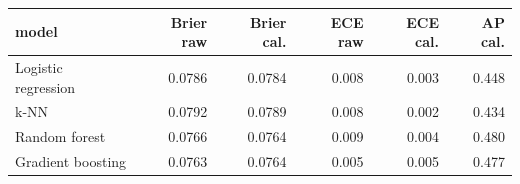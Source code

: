 \begin{tabular}{lrrrrr}
\toprule
model & Brier raw & Brier cal. & ECE raw & ECE cal. & AP cal. \\
\midrule
Logistic regression & 0.0786 & 0.0784 & 0.008 & 0.003 & 0.448 \\
k-NN & 0.0792 & 0.0789 & 0.008 & 0.002 & 0.434 \\
Random forest & 0.0766 & 0.0764 & 0.009 & 0.004 & 0.480 \\
Gradient boosting & 0.0763 & 0.0764 & 0.005 & 0.005 & 0.477 \\
\bottomrule
\end{tabular}